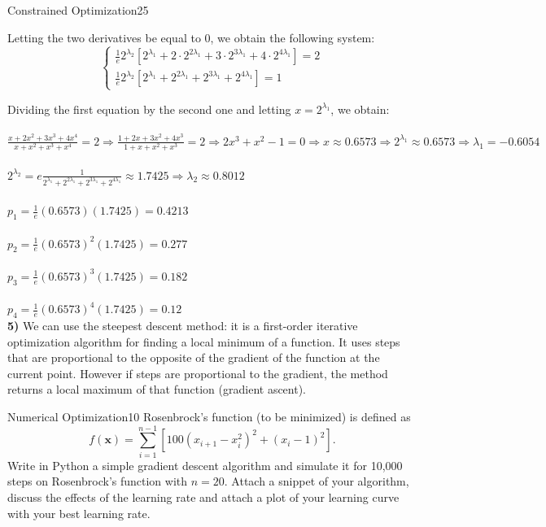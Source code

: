 \begin{questions}
\begin{question}{Constrained Optimization}{25}
\begin{answer}
Letting the two derivatives be equal to 0, we obtain the following system:
\begin{equation}
\begin{cases}
\frac{1}{e} 2^{\lambda_{2}} \left[2^{\lambda_{1}} + 2 \cdot 2^{2 \lambda_{1}} + 3 \cdot 2^{3 \lambda_{1}} + 4 \cdot 2^{4 \lambda_{1}} \right] = 2\\ 
\frac{1}{e} 2^{\lambda_{2}} \left[2^{\lambda_{1}} + 2^{2 \lambda_{1}} + 2^{3 \lambda_{1}} + 2^{4 \lambda_{1}} \right] = 1
\end{cases}
\end{equation}

Dividing the first equation by the second one and letting $x=2^{\lambda_{1}}$, we obtain: \\ \\
$ \frac{x+2x^{2}+3x^{3}+4x^{4}}{x+x^{2}+x^{3}+x^{4}}=2 \Rightarrow \frac{1+2x+3x^{2}+4x^{3}}{1+x+x^{2}+x^{3}}=2 
\Rightarrow 2x^{3}+x^{2}-1=0 \Rightarrow x \approx 0.6573  \Rightarrow 2^{\lambda_{1}} \approx 0.6573 \Rightarrow \lambda_{1} = -0.6054 $ \\ \\
$ 2^{\lambda_{2}} = e \frac{1}{2^{\lambda_{1}}+ 2^{2 \lambda_{1}} + 2^{3 \lambda_{1}} + 2^{4 \lambda_{1}}} \approx 1.7425 \Rightarrow \lambda_{2} \approx 0.8012 $ \\ \\
$ p_{1}=\frac{1}{e}(0.6573)(1.7425)=0.4213 $ \\ \\
$ p_{2}=\frac{1}{e}(0.6573)^{2}(1.7425)=0.277 $ \\ \\
$ p_{3}=\frac{1}{e}(0.6573)^{3}(1.7425)=0.182 $ \\ \\
$ p_{4}=\frac{1}{e}(0.6573)^{4}(1.7425)=0.12 $ \\

\textbf{5)} We can use the steepest descent method: it is a first-order iterative optimization algorithm for finding a local minimum of a function. It uses  steps that are proportional to the opposite of the gradient of the function at the current point. However if steps are proportional to the gradient, the method returns a local maximum of that function (gradient ascent).
\end{answer}

\end{question}
	


\begin{question}{Numerical Optimization}{10}
Rosenbrock's function (to be minimized) is defined as 
$$f(\boldsymbol{x}) = \sum_{i=1}^{n-1} \left[ 100 (x_{i+1} - x_{i}^{2})^{2} + (x_{i} - 1)^{2}\right].$$
Write in Python a simple gradient descent algorithm and simulate it for 10,000 steps on Rosenbrock's function with $n=20$. Attach a snippet of your algorithm, discuss the effects of the learning rate and attach a plot of your learning curve with your best learning rate.


\end{question}
\end{questions}
